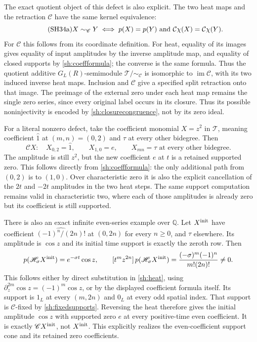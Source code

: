 \documentclass[11pt]{article}
\DeclareMathOperator{\im}{im}
\newcommand{\Q}{\mathbb Q}
\begin{document}
The exact quotient object of this defect is also explicit.
The two heat maps and the retraction $\mathscr C$ have the
same kernel equivalence:
\begin{equation}\tag{SH34a}\label{sh:closurecongruence}
 X\sim_{\mathscr C}Y
 \iff p(X)=p(Y)\ \hbox{and}\
            \mathcal C\chi(X)=\mathcal C\chi(Y).
\end{equation}
For $\mathscr C$ this follows from its coordinate definition.
For heat, equality of its images gives equality of input
amplitudes by the inverse amplitude map, and equality of
closed supports by \eqref{sh:coeffformula}; the converse is
the same formula. Thus the quotient additive $G_L(R)$-semimodule
$\mathscr T/{\sim_{\mathscr C}}$ is isomorphic to
$\im\mathscr C$, with its two induced inverse heat maps.
Inclusion and $\mathscr C$ give a specified split retraction
onto that image. The preimage of the external zero under each
heat map remains the single zero series, since every original
label occurs in its closure. Thus its possible noninjectivity
is encoded by \eqref{sh:closurecongruence}, not by its zero ideal.

For a literal nonzero defect, take the coefficient monomial
$X=z^2$ in $\mathscr T$, meaning coefficient $\widehat1$
at $(m,n)=(0,2)$ and $\tau$ at every other bidegree. Then
\begin{equation}\tag{SH35}\label{sh:zerotail}
 \mathscr C X:
 \quad X_{0,2}=\widehat1,\qquad
 X_{1,0}=e,\qquad
 X_{mn}=\tau\text{ at every other bidegree}.
\end{equation}
The amplitude is still $z^2$, but the new coefficient $e$ at
$t$ is a retained supported zero. This follows directly from
\eqref{sh:coeffformula}: the only additional path from $(0,2)$
is to $(1,0)$. Over characteristic zero it is also the explicit
cancellation of the $2t$ and $-2t$ amplitudes in the two heat
steps. The same support computation remains valid in
characteristic two, where each of those amplitudes is already
zero but its coefficient is still supported.

There is also an exact infinite even-series example over $\Q$.
Let $X^{\rm init}$ have coefficient
$\widehat{(-1)^n/(2n)!}$ at $(0,2n)$ for every $n\ge0$,
and $\tau$ elsewhere. Its amplitude is $\cos z$ and its
initial time support is exactly the zeroth row. Then
\[
 p(\mathscr H_\sigma X^{\rm init})
       =e^{-\sigma t}\cos z,\qquad
 [t^mz^{2n}]\,p(\mathscr H_\sigma X^{\rm init})
       =\frac{(-\sigma)^m(-1)^n}{m!(2n)!}\ne0 .
\]
This follows either by direct substitution in \eqref{sh:heat},
using $\partial_z^{2m}\cos z=(-1)^m\cos z$, or by the
displayed coefficient formula itself. Its support is $1_L$ at
every $(m,2n)$ and $0_L$ at every odd spatial index.
That support is $\mathcal C$-fixed by \eqref{sh:fixedsupports}.
Reversing the heat therefore gives the initial amplitude
$\cos z$ with supported zero $e$ at every positive-time even
coefficient. It is exactly $\mathscr C X^{\rm init}$, not
$X^{\rm init}$. This explicitly realizes the even-coefficient
support cone and its retained zero coefficients.
\end{document}
